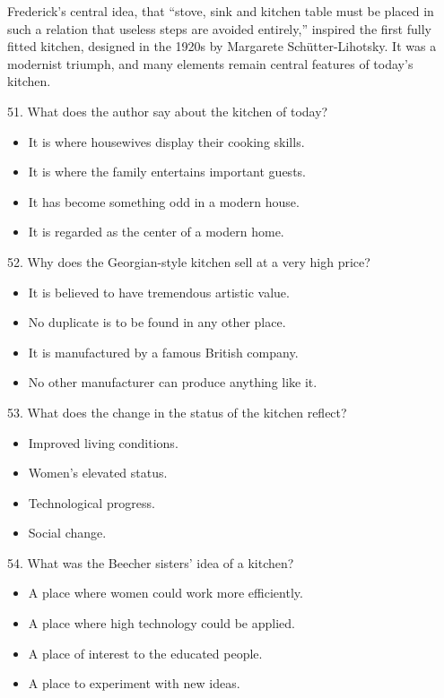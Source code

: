 \documentclass[UTF8,11pt]{ctexart}
\begin{document}
Frederick’s central idea, that “stove, sink and kitchen table must be placed in such a relation that useless steps are avoided entirely,” inspired the first fully fitted kitchen, designed in the 1920s by Margarete Schütter-Lihotsky. It was a modernist triumph, and many elements remain central features of today’s kitchen.


51. What does the author say about the kitchen of today?


\begin{itemize}[leftmargin=2em,itemsep=.2em,topsep=.4em]\item[A.] It is where housewives display their cooking skills.
\item[B.] It is where the family entertains important guests.
\item[C.] It has become something odd in a modern house.
\item[D.] It is regarded as the center of a modern home.
\end{itemize}

52. Why does the Georgian-style kitchen sell at a very high price?


\begin{itemize}[leftmargin=2em,itemsep=.2em,topsep=.4em]\item[A.] It is believed to have tremendous artistic value.
\item[B.] No duplicate is to be found in any other place.
\item[C.] It is manufactured by a famous British company.
\item[D.] No other manufacturer can produce anything like it.
\end{itemize}

53. What does the change in the status of the kitchen reflect?


\begin{itemize}[leftmargin=2em,itemsep=.2em,topsep=.4em]\item[A.] Improved living conditions.
\item[B.] Women’s elevated status.
\item[C.] Technological progress.
\item[D.] Social change.
\end{itemize}

54. What was the Beecher sisters’ idea of a kitchen?


\begin{itemize}[leftmargin=2em,itemsep=.2em,topsep=.4em]\item[A.] A place where women could work more efficiently.
\item[B.] A place where high technology could be applied.
\item[C.] A place of interest to the educated people.
\item[D.] A place to experiment with new ideas.
\end{itemize}
\end{document}
